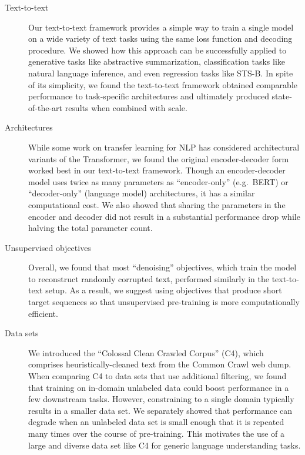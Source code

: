 \begin{description}

\item[Text-to-text] Our text-to-text framework provides a simple way to train a single model on a wide variety of text tasks using the same loss function and decoding procedure. We showed how this approach can be successfully applied to generative tasks like abstractive summarization, classification tasks like natural language inference, and even regression tasks like STS-B. In spite of its simplicity, we found the text-to-text framework obtained comparable performance to task-specific architectures and ultimately produced state-of-the-art results when combined with scale.

\item[Architectures] While some work on transfer learning for NLP has considered architectural variants of the Transformer, we found the original encoder-decoder form worked best in our text-to-text framework. Though an encoder-decoder model uses twice as many parameters as ``encoder-only'' (e.g.\ BERT) or ``decoder-only'' (language model) architectures, it has a similar computational cost. We also showed that sharing the parameters in the encoder and decoder did not result in a substantial performance drop while halving the total parameter count.

\item[Unsupervised objectives] Overall, we found that most ``denoising'' objectives, which train the model to reconstruct randomly corrupted text, performed similarly in the text-to-text setup. As a result, we suggest using objectives that produce short target sequences so that unsupervised pre-training is more computationally efficient.

\item[Data sets] We introduced the ``Colossal Clean Crawled Corpus'' (C4), which comprises heuristically-cleaned text from the Common Crawl web dump. When comparing C4 to data sets that use additional filtering, we found that training on in-domain unlabeled data could boost performance in a few downstream tasks. However, constraining to a single domain typically results in a smaller data set. We separately showed that performance can degrade when an unlabeled data set is small enough that it is repeated many times over the course of pre-training. This motivates the use of a large and diverse data set like C4 for generic language understanding tasks.


\end{description}
